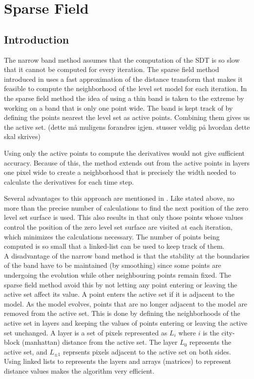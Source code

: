 \chapter{Sparse Field}

\section{Introduction}

The narrow band  method assumes that the computation of the SDT is so slow that it cannot be computed for every iteration. The sparse field method introduced in \cite{whitaker89} uses a fast approximation of the distance transform that makes it feasible to compute the neighborhood of the level set model for each iteration. In the sparse field method the idea of using a thin band is taken to the extreme by working on a band that is only one point wide. The band is kept track of by defining the points nearest the level set as active points. Combining them gives us the active set. (dette må muligens forandres igjen. stusser veldig på hvordan dette skal skrives)

Using only the active points to compute the derivatives would not give sufficient accuracy. Because of this, the method extends out from the active points in layers one pixel wide to create a neighborhood that is precisely the width needed to calculate the derivatives for each time step.


Several advantages to this approach are mentioned in \cite{whitaker89}. Like stated above, no more than the precise number of calculations to find the next position of the zero level set surface is used. This also results in that only those points whose values control the position of the zero level set surface are visited at each iteration, which minimizes the calculations necessary. The number of points being computed is so small that a linked-list can be used to keep track of them. \\





A disadvantage of the narrow band method is that the stability at the boundaries of the band have to be maintained (by smoothing) since some points are undergoing the evolution while other neighbouring points remain fixed. The sparse field method avoid this by not letting any point entering or leaving the active set affect its value. A point enters the active set if it is adjacent to the model. As the model evolves, points that are no longer adjacent to the model are removed from the active set. This is done by defining the neighborhoods of the active set in layers and keeping the values of points entering or leaving the active set unchanged. A layer is a set of pixels represented as \(L_{i}\) where \(i\) is the city-block (manhattan) distance from the active set. The layer \(L_{0}\) represents the active set, and \(L_{\pm 1}\) reprsents pixels adjacent to the active set on both sides. Using linked lists to represents the layers and arrays (matrices) to represent distance values makes the algorithm very efficient. 

